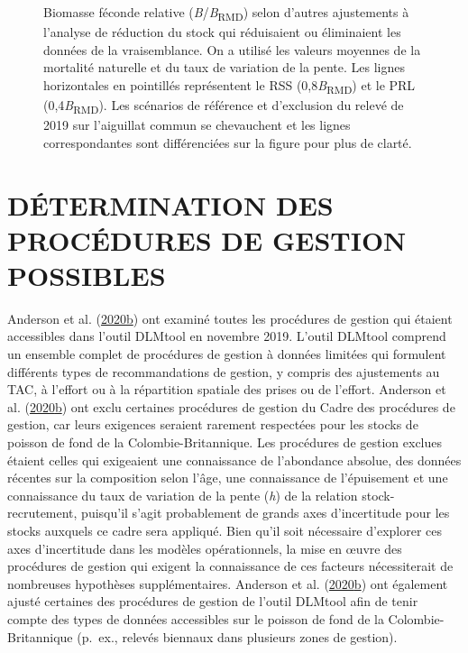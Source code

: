 \documentclass[french,11pt]{book}
\begin{document}
\begin{figure}[htb]

{\centering {} 

}

\caption{Biomasse féconde relative (\emph{B}/\emph{B}\textsubscript{RMD}) selon d'autres ajustements à l'analyse de réduction du stock qui réduisaient ou éliminaient les données de la vraisemblance. On a utilisé les valeurs moyennes de la mortalité naturelle et du taux de variation de la pente. Les lignes horizontales en pointillés représentent le RSS (0,8\emph{B}\textsubscript{RMD}) et le PRL (0,4\emph{B}\textsubscript{RMD}). Les scénarios de référence et d'exclusion du relevé de 2019 sur l'aiguillat commun se chevauchent et les lignes correspondantes sont différenciées sur la figure pour plus de clarté.}\label{fig:alt-SRA-fit}
\end{figure}
\clearpage

\hypertarget{sec:mp}{%
\section{DÉTERMINATION DES PROCÉDURES DE GESTION POSSIBLES}\label{sec:mp}}

Anderson et al. (\protect\hyperlink{ref-anderson2020gfmp}{2020}\protect\hyperlink{ref-anderson2020gfmp}{b}) ont examiné toutes les procédures de gestion qui étaient accessibles dans l'outil DLMtool en novembre 2019. L'outil DLMtool comprend un ensemble complet de procédures de gestion à données limitées qui formulent différents types de recommandations de gestion, y compris des ajustements au TAC, à l'effort ou à la répartition spatiale des prises ou de l'effort. Anderson et al. (\protect\hyperlink{ref-anderson2020gfmp}{2020}\protect\hyperlink{ref-anderson2020gfmp}{b}) ont exclu certaines procédures de gestion du Cadre des procédures de gestion, car leurs exigences seraient rarement respectées pour les stocks de poisson de fond de la Colombie-Britannique. Les procédures de gestion exclues étaient celles qui exigeaient une connaissance de l'abondance absolue, des données récentes sur la composition selon l'âge, une connaissance de l'épuisement et une connaissance du taux de variation de la pente (\emph{h}) de la relation stock-recrutement, puisqu'il s'agit probablement de grands axes d'incertitude pour les stocks auxquels ce cadre sera appliqué. Bien qu'il soit nécessaire d'explorer ces axes d'incertitude dans les modèles opérationnels, la mise en œuvre des procédures de gestion qui exigent la connaissance de ces facteurs nécessiterait de nombreuses hypothèses supplémentaires. Anderson et al. (\protect\hyperlink{ref-anderson2020gfmp}{2020}\protect\hyperlink{ref-anderson2020gfmp}{b}) ont également ajusté certaines des procédures de gestion de l'outil DLMtool afin de tenir compte des types de données accessibles sur le poisson de fond de la Colombie-Britannique (p.~ex., relevés biennaux dans plusieurs zones de gestion).
\end{document}
